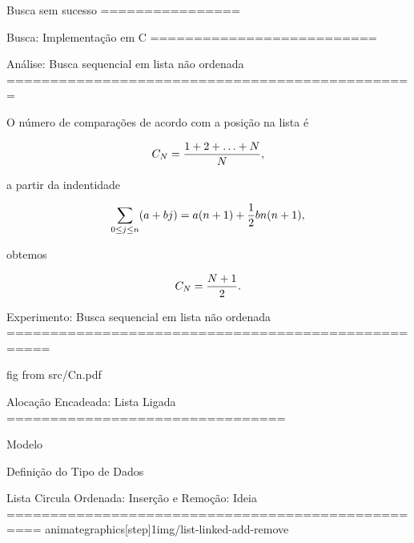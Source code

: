 Busca sem sucesso
================




Busca: Implementação em C
==========================




Análise: Busca sequencial em lista não ordenada
===============================================

\noindent O número de comparações de acordo com a posição na lista é

  $$C_N = {{1 + 2 + \ldots + N} \over N}, $$

\noindent  a partir da indentidade 


 $$\sum_{0\leq j\leq n} (a + bj) = a(n + 1) + {1\over 2} bn (n + 1), $$

\noindent obtemos

  $$ C_N = {{N + 1} \over 2}.$$


Experimento: Busca sequencial em lista não ordenada
===================================================

fig from src/Cn.pdf
 
Alocação Encadeada: Lista Ligada
================================

\begin{block}{Modelo}

\bigskip
{}

\end{block}

\bigskip
\begin{block}{Definição do Tipo de Dados}

\end{block}


Lista Circula Ordenada: Inserção e Remoção: Ideia
==================================================
  animategraphics[step]{1}{img/list-linked-add-remove}{}{}     


